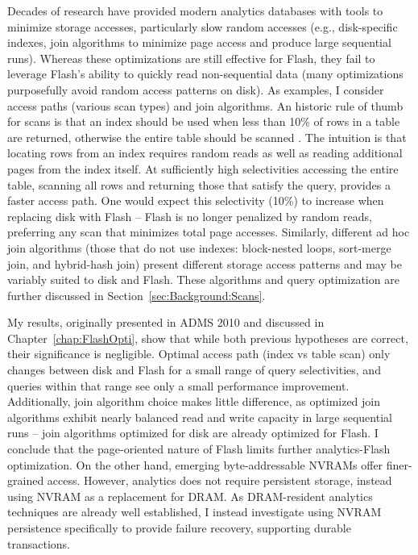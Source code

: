 Decades of research have provided modern analytics databases with tools to minimize storage accesses, particularly slow random accesses (e.g., disk-specific indexes, join algorithms to minimize page access and produce large sequential runs).
Whereas these optimizations are still effective for Flash, they fail to leverage Flash's ability to quickly read non-sequential data (many optimizations purposefully avoid random access patterns on disk).
As examples, I consider access paths (various scan types) and join algorithms.
An historic rule of thumb for scans is that an index should be used when less than 10\% of rows in a table are returned, otherwise the entire table should be scanned \cite{RamakrishnanAndGehrke}.
The intuition is that locating rows from an index requires random reads as well as reading additional pages from the index itself.
At sufficiently high selectivities accessing the entire table, scanning all rows and returning those that satisfy the query, provides a faster access path.
One would expect this selectivity (10\%) to increase when replacing disk with Flash -- Flash is no longer penalized by random reads, preferring any scan that minimizes total page accesses.
Similarly, different ad hoc join algorithms (those that do not use indexes: block-nested loops, sort-merge join, and hybrid-hash join) present different storage access patterns and may be variably suited to disk and Flash.
These algorithms and query optimization are further discussed in Section~\ref{sec:Background:Scans}.

My results, originally presented in ADMS 2010 \cite{PelleyWenisch11} and discussed in Chapter~\ref{chap:FlashOpti}, show that while both previous hypotheses are correct, their significance is negligible.
Optimal access path (index vs table scan) only changes between disk and Flash for a small range of query selectivities, and queries within that range see only a small performance improvement.
Additionally, join algorithm choice makes little difference, as optimized join algorithms exhibit nearly balanced read and write capacity in large sequential runs -- join algorithms optimized for disk are already optimized for Flash.
I conclude that the page-oriented nature of Flash limits further analytics-Flash optimization.
On the other hand, emerging byte-addressable NVRAMs offer finer-grained access.
However, analytics does not require persistent storage, instead using NVRAM as a replacement for DRAM.
As DRAM-resident analytics techniques are already well established, I instead investigate using NVRAM persistence specifically to provide failure recovery, supporting durable transactions.

